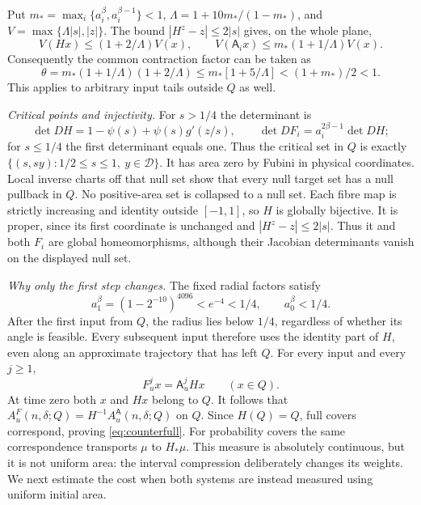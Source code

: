 \documentclass[11pt]{amsart}
\theoremstyle{definition}
\theoremstyle{remark}
\numberwithin{equation}{section}
\begin{document}
Put $m_* =\max_i\{a_i^\beta,a_i^{\beta-1}\}<1$,
$\Lambda=1+10m_* /(1-m_*)$, and $V=\max\{\Lambda|s|,|z|\}$.
The bound $|H^z-z|\le2|s|$ gives, on the whole plane,
\[
V(Hx)\le(1+2/\Lambda)V(x),\qquad
V(\mathsf A_i x)\le m_*(1+1/\Lambda)V(x).
\]
Consequently the common contraction factor can be taken as
\[
\theta=m_*(1+1/\Lambda)(1+2/\Lambda)
 \le m_*[1+5/\Lambda]<(1+m_*)/2<1.
\]
This applies to arbitrary input tails outside $Q$ as well.

\smallskip
\emph{Critical points and injectivity.}
For $s>1/4$ the determinant is
\[
\det DH=1-\psi(s)+\psi(s)g'(z/s),\qquad
\det DF_i=a_i^{2\beta-1}\det DH;
\]
for $s\le1/4$ the first determinant equals one.
Thus the critical set in $Q$ is exactly
$\{(s,sy):1/2\le s\le1,\ y\in\mathcal D\}$.
It has area zero by Fubini in physical coordinates. Local inverse
charts off that null set show that every null target set has a null
pullback in $Q$. No positive-area set is collapsed to a null set.
Each fibre map is strictly increasing and identity outside $[-1,1]$,
so $H$ is globally bijective. It is proper, since its first coordinate
is unchanged and $|H^z-z|\le2|s|$. Thus it and both $F_i$ are
global homeomorphisms, although their Jacobian determinants vanish
on the displayed null set.

\smallskip
\emph{Why only the first step changes.}
The fixed radial factors satisfy
\[
a_1^\beta=(1-2^{-10})^{4096}<e^{-4}<1/4,
\qquad a_0^\beta<1/4.
\]
After the first input from $Q$, the radius lies below $1/4$,
regardless of whether its angle is feasible. Every subsequent input
therefore uses the identity part of $H$, even along an approximate
trajectory that has left $Q$. For every input and every $j\ge1$,
\begin{equation}\label{eq:onetransient}
F_u^j x=\mathsf A_u^j Hx\qquad(x\in Q).
\end{equation}
At time zero both $x$ and $Hx$ belong to $Q$. It follows that
$A_u^F(n,\delta;Q)=H^{-1}A_u^{\mathsf A}(n,\delta;Q)$ on $Q$.
Since $H(Q)=Q$, full covers correspond, proving
\eqref{eq:counterfull}. For probability covers the same correspondence transports $\mu$
to $H_*\mu$. This measure is absolutely continuous, but it is not
uniform area: the interval compression deliberately changes its
weights. We next estimate the cost when both systems are instead
measured using uniform initial area.
\end{document}
